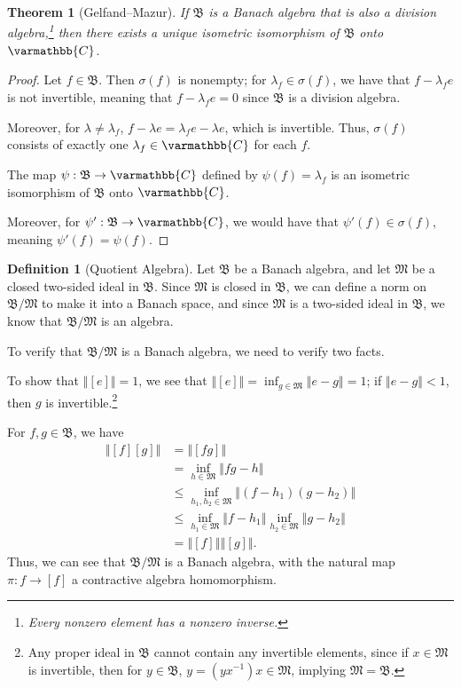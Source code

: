 \documentclass[12pt]{extarticle}
\newcommand{\C}{\mathbb{C}}
\newcommand{\norm}[1]{\left\Vert #1\right\Vert}
\theoremstyle{plain}
\newtheorem*{theorem}{Theorem}
\theoremstyle{definition}
\newtheorem*{definition}{Definition}
\theoremstyle{note}
\renewcommand*{\mathbb}[1]{\varmathbb{#1}}
\renewcommand{\newline}{\hfill\break}
\begin{document}
\begin{theorem}[Gelfand--Mazur]
  If $\mathfrak{B}$ is a Banach algebra that is also a division algebra,\footnote{Every nonzero element has a nonzero inverse.} then there exists a unique isometric isomorphism of $\mathfrak{B}$ onto $\C$.
\end{theorem}
\begin{proof}
  Let $f\in \mathfrak{B}$. Then $\sigma(f)$ is nonempty; for $\lambda_f\in \sigma(f)$, we have that $f-\lambda_f e$ is not invertible, meaning that $f - \lambda_f e = 0$ since $\mathfrak{B}$ is a division algebra.\newline

  Moreover, for $\lambda \neq \lambda_f$, $f - \lambda e = \lambda_f e - \lambda e$, which is invertible. Thus, $\sigma(f)$ consists of exactly one $\lambda_f\in \C$ for each $f$.\newline

  The map $\psi: \mathfrak{B}\rightarrow \C$ defined by $\psi(f) = \lambda_f$ is an isometric isomorphism of $\mathfrak{B}$ onto $\C$.\newline

  Moreover, for $\psi': \mathfrak{B} \rightarrow \C$, we would have that $\psi'(f) \in \sigma(f)$, meaning $\psi'(f) = \psi(f)$.
\end{proof}
\begin{definition}[Quotient Algebra]
Let $\mathfrak{B}$ be a Banach algebra, and let $\mathfrak{M}$ be a closed two-sided ideal in $\mathfrak{B}$. Since $\mathfrak{M}$ is closed in $\mathfrak{B}$, we can define a norm on $\mathfrak{B}/\mathfrak{M}$ to make it into a Banach space, and since $\mathfrak{M}$ is a two-sided ideal in $\mathfrak{B}$, we know that $\mathfrak{B}/\mathfrak{M}$ is an algebra.\newline

To verify that $\mathfrak{B}/\mathfrak{M}$ is a Banach algebra, we need to verify two facts.\newline

To show that $\norm{[e]} = 1$, we see that $\norm{[e]} = \inf_{g\in \mathfrak{M}} \norm{e-g} = 1$; if $\norm{e-g} < 1$, then $g$ is invertible.\footnote{Any proper ideal in $\mathfrak{B}$ cannot contain any invertible elements, since if $x\in \mathfrak{M}$ is invertible, then for $y\in \mathfrak{B}$, $y = \left(yx^{-1}\right)x \in \mathfrak{M}$, implying $\mathfrak{M} = \mathfrak{B}$.}\newline

For $f,g\in \mathfrak{B}$, we have
\begin{align*}
  \norm{[f][g]} &= \norm{[fg]}\\
                &= \inf_{h\in \mathfrak{M}}\norm{fg - h}\\
                &\leq \inf_{h_1,h_2\in \mathfrak{M}}\norm{(f-h_1)(g-h_2)}\\
                &\leq \inf_{h_1\in \mathfrak{M}}\norm{f-h_1}\inf_{h_2\in \mathfrak{M}}\norm{g-h_2}\\
                &= \norm{[f]}\norm{[g]}.
\end{align*}
Thus, we can see that $\mathfrak{B}/\mathfrak{M}$ is a Banach algebra, with the natural map $\pi: f \rightarrow [f]$ a contractive algebra homomorphism.
\end{definition}
\end{document}
